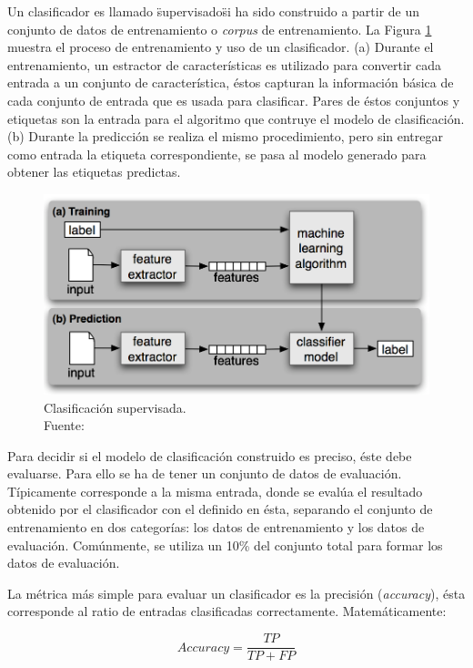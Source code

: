 Un clasificador es llamado \"supervisado\" si ha sido construido a partir de un conjunto de datos de entrenamiento o \textit{corpus} de entrenamiento. La Figura \ref{fig:NPLK} muestra el proceso de entrenamiento y uso de un clasificador. (a) Durante el entrenamiento, un estractor de características es utilizado para convertir cada entrada a un conjunto de característica, éstos capturan la información básica de cada conjunto de entrada que es usada para clasificar. Pares de éstos conjuntos y etiquetas son la entrada para el algoritmo que contruye el modelo de clasificación. (b) Durante la predicción se realiza el mismo procedimiento, pero sin entregar como entrada la etiqueta correspondiente, se pasa al modelo generado para obtener las etiquetas predictas.

\begin{figure}[H]
	\centering
	\captionsetup{justification=centering}
	\includegraphics[scale=0.8]{images/TrainingPrediction.png}
	\caption[Clasificación supervisada.]{Clasificación supervisada.\\Fuente: \cite{NPLK}}
	\label{fig:NPLK}
\end{figure}

Para decidir si el modelo de clasificación construido es preciso, éste debe evaluarse. Para ello se ha de tener un conjunto de datos de evaluación. Típicamente corresponde a la misma entrada, donde se evalúa el resultado obtenido por el clasificador con el definido en ésta, separando el conjunto de entrenamiento en dos categorías: los datos de entrenamiento y los datos de evaluación. Comúnmente, se utiliza un 10\% del conjunto total para formar los datos de evaluación.

La métrica más simple para evaluar un clasificador es la precisión (\textit{accuracy}), ésta corresponde al ratio de entradas clasificadas correctamente. Matemáticamente:

\[
	Accuracy = \frac{TP}{TP+FP}
\]

